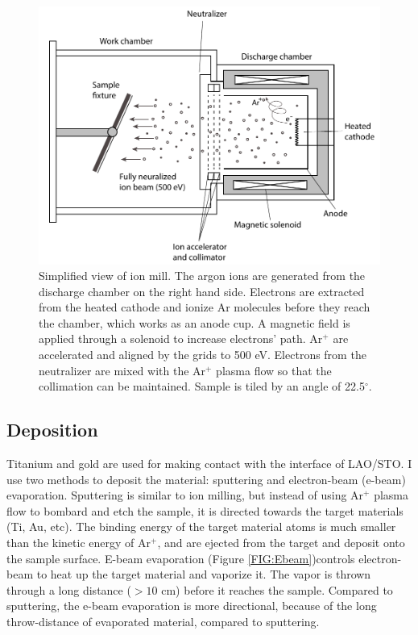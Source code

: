 \documentclass[pdflatex, sectionletters, 12pt]{pittetd}    %
\begin{document}
\begin{figure}[hp]
	\centering
	\includegraphics[width=1.0\textwidth]{Drawing/IonMill.pdf}
	\caption{Simplified view of ion mill. The argon ions are generated from the discharge chamber on the right hand side. Electrons are extracted from the heated cathode and ionize Ar molecules before they reach the chamber, which works as an anode cup. A magnetic field is applied through a solenoid to increase electrons' path. Ar$^{+}$ are accelerated and aligned by the grids to 500 eV. Electrons from the neutralizer are mixed with the Ar$^{+}$ plasma flow so that the collimation can be maintained. Sample is tiled by an angle of 22.5$^{\circ}$.}
	\label{FIG:IonMill}
\end{figure}

\subsection{Deposition}

Titanium and gold are used for making contact with the interface of LAO/STO. I use two methods to deposit the material: sputtering and electron-beam (e-beam) evaporation. Sputtering is similar to ion milling, but instead of using Ar$^{+}$ plasma flow to bombard and etch the sample, it is directed towards the target materials (Ti, Au, etc). The binding energy of the target material atoms is much smaller than the kinetic energy of Ar$^{+}$, and are ejected from the target and deposit onto the sample surface. E-beam evaporation (Figure \ref{FIG:Ebeam})controls electron-beam to heat up the target material and vaporize it. The vapor is thrown through a long distance ($> 10$ cm) before it reaches the sample. Compared to sputtering, the e-beam evaporation is more directional, because of the long throw-distance of evaporated material, compared to sputtering. 
\end{document}
